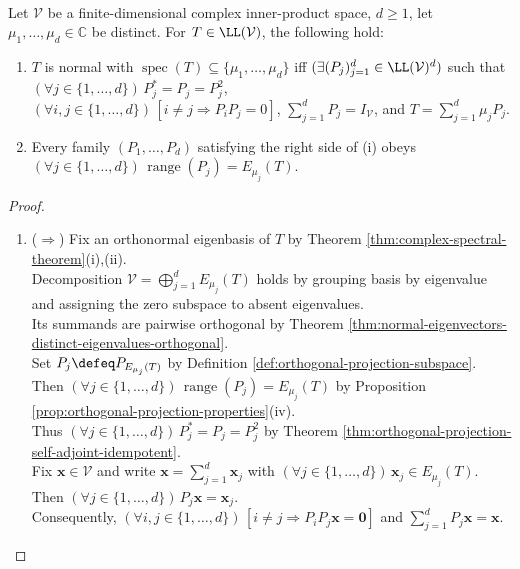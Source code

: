 \begin{theorem} \label{thm:spectral-resolution-normal-operator} \\
Let $\mathcal{V}$ be a finite-dimensional complex inner-product space, $d\geq1$, let $\mu_1,\ldots,\mu_d\in\mathbb{C}$ be distinct. For $T\in\LL(\mathcal{V})$, the following hold:
\begin{enumerate}[label=(\roman*)]
\setlength{\itemsep}{0pt}
\item $T$ is normal with $\operatorname{spec}(T)\subseteq\{\mu_1,\ldots,\mu_d\}$ iff $(\exists(P_j)_{j=1}^{d}\in\LL(\mathcal{V})^d)$ such that $(\forall j\in\{1,\ldots,d\})\,P_j^*=P_j=P_j^2$,\\
$(\forall i,j\in\{1,\ldots,d\})\,[i\neq j\Longrightarrow P_iP_j=0]$, $\sum\limits_{j=1}^{d}P_j=I_{\mathcal{V}}$, and $T=\sum\limits_{j=1}^{d}\mu_jP_j$.
\item Every family $(P_1,\ldots,P_d)$ satisfying the right side of (i) obeys $(\forall j\in\{1,\ldots,d\})\,\operatorname{range}(P_j)=E_{\mu_j}(T)$.
\end{enumerate}
\begin{proof}
\begin{enumerate}[label=(\roman*)]
\setlength{\itemsep}{0pt}
\item[$(i)$] ($\Rightarrow$) Fix an orthonormal eigenbasis of $T$ by Theorem \ref{thm:complex-spectral-theorem}(i),(ii).\\
Decomposition $\mathcal{V}=\bigoplus\limits_{j=1}^{d}E_{\mu_j}(T)$ holds by grouping basis by eigenvalue and assigning the zero subspace to absent eigenvalues.\\
Its summands are pairwise orthogonal by Theorem \ref{thm:normal-eigenvectors-distinct-eigenvalues-orthogonal}.\\
Set $P_j\defeq P_{E_{\mu_j}(T)}$ by Definition \ref{def:orthogonal-projection-subspace}. Then $(\forall j\in\{1,\ldots,d\})\,\operatorname{range}(P_j)=E_{\mu_j}(T)$ by Proposition \ref{prop:orthogonal-projection-properties}(iv).\\
Thus $(\forall j\in\{1,\ldots,d\})\,P_j^*=P_j=P_j^2$ by Theorem \ref{thm:orthogonal-projection-self-adjoint-idempotent}.\\
Fix $\mathbf{x}\in\mathcal{V}$ and write $\mathbf{x}=\sum\limits_{j=1}^{d}\mathbf{x}_j$ with $(\forall j\in\{1,\ldots,d\})\,\mathbf{x}_j\in E_{\mu_j}(T)$. Then $(\forall j\in\{1,\ldots,d\})\,P_j\mathbf{x}=\mathbf{x}_j$.\\
Consequently, $(\forall i,j\in\{1,\ldots,d\})\,[i\neq j\Longrightarrow P_iP_j\mathbf{x}=\mathbf{0}]$ and $\sum\limits_{j=1}^{d}P_j\mathbf{x}=\mathbf{x}$.\\

\end{enumerate}
\end{proof}
\end{theorem}
